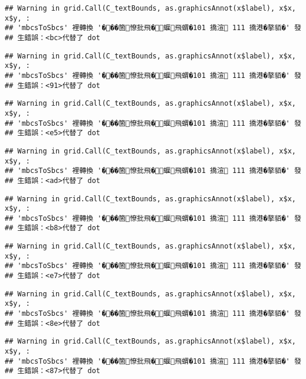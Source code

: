 \documentclass[
]{article}
\begin{document}
\begin{verbatim}
## Warning in grid.Call(C_textBounds, as.graphicsAnnot(x$label), x$x, x$y, :
## 'mbcsToSbcs' 裡轉換 '���箇憭批飛�蝘飛蝟�101 撟渲 111 撟港�摮貊�' 發
## 生錯誤：<bc>代替了 dot
\end{verbatim}

\begin{verbatim}
## Warning in grid.Call(C_textBounds, as.graphicsAnnot(x$label), x$x, x$y, :
## 'mbcsToSbcs' 裡轉換 '���箇憭批飛�蝘飛蝟�101 撟渲 111 撟港�摮貊�' 發
## 生錯誤：<91>代替了 dot
\end{verbatim}

\begin{verbatim}
## Warning in grid.Call(C_textBounds, as.graphicsAnnot(x$label), x$x, x$y, :
## 'mbcsToSbcs' 裡轉換 '���箇憭批飛�蝘飛蝟�101 撟渲 111 撟港�摮貊�' 發
## 生錯誤：<e5>代替了 dot
\end{verbatim}

\begin{verbatim}
## Warning in grid.Call(C_textBounds, as.graphicsAnnot(x$label), x$x, x$y, :
## 'mbcsToSbcs' 裡轉換 '���箇憭批飛�蝘飛蝟�101 撟渲 111 撟港�摮貊�' 發
## 生錯誤：<ad>代替了 dot
\end{verbatim}

\begin{verbatim}
## Warning in grid.Call(C_textBounds, as.graphicsAnnot(x$label), x$x, x$y, :
## 'mbcsToSbcs' 裡轉換 '���箇憭批飛�蝘飛蝟�101 撟渲 111 撟港�摮貊�' 發
## 生錯誤：<b8>代替了 dot
\end{verbatim}

\begin{verbatim}
## Warning in grid.Call(C_textBounds, as.graphicsAnnot(x$label), x$x, x$y, :
## 'mbcsToSbcs' 裡轉換 '���箇憭批飛�蝘飛蝟�101 撟渲 111 撟港�摮貊�' 發
## 生錯誤：<e7>代替了 dot
\end{verbatim}

\begin{verbatim}
## Warning in grid.Call(C_textBounds, as.graphicsAnnot(x$label), x$x, x$y, :
## 'mbcsToSbcs' 裡轉換 '���箇憭批飛�蝘飛蝟�101 撟渲 111 撟港�摮貊�' 發
## 生錯誤：<8e>代替了 dot
\end{verbatim}

\begin{verbatim}
## Warning in grid.Call(C_textBounds, as.graphicsAnnot(x$label), x$x, x$y, :
## 'mbcsToSbcs' 裡轉換 '���箇憭批飛�蝘飛蝟�101 撟渲 111 撟港�摮貊�' 發
## 生錯誤：<87>代替了 dot
\end{verbatim}
\end{document}
